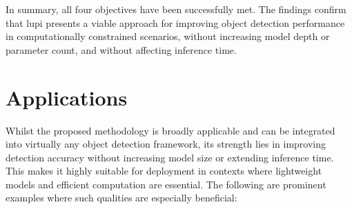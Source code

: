 In summary, all four objectives have been successfully met. The findings confirm that \gls{lupi} presents a viable approach for improving object detection performance in computationally constrained scenarios, without increasing model depth or parameter count, and without affecting inference time.

\section{Applications}
\label{sec:6_applications}

Whilst the proposed methodology is broadly applicable and can be integrated into virtually any object detection framework, its strength lies in improving detection accuracy without increasing model size or extending inference time. This makes it highly suitable for deployment in contexts where lightweight models and efficient computation are essential. The following are prominent examples where such qualities are especially beneficial:

